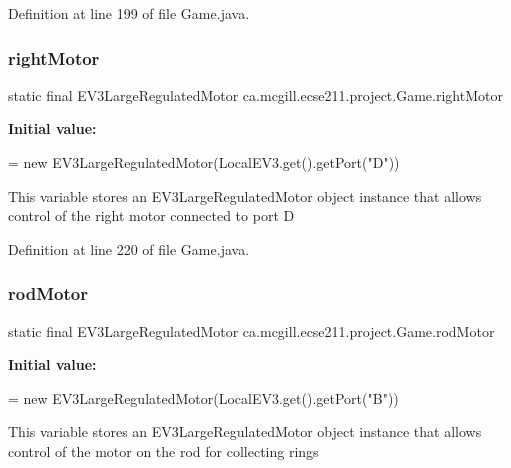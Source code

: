 Definition at line 199 of file Game.\+java.

\mbox{\label{enumca_1_1mcgill_1_1ecse211_1_1project_1_1_game_a7a05fcf37c4435c32270776a427ba0d2}} 
\subsubsection{\texorpdfstring{right\+Motor}{rightMotor}}
{\footnotesize\ttfamily  static  final E\+V3\+Large\+Regulated\+Motor ca.\+mcgill.\+ecse211.\+project.\+Game.\+right\+Motor\hspace{0.3cm}{\ttfamily [static]}}

{\bfseries Initial value\+:}
\begin{DoxyCode}
=
      \textcolor{keyword}{new} EV3LargeRegulatedMotor(LocalEV3.get().getPort(\textcolor{stringliteral}{"D"}))
\end{DoxyCode}
This variable stores an E\+V3\+Large\+Regulated\+Motor object instance that allows control of the right motor connected to port D 

Definition at line 220 of file Game.\+java.

\mbox{\label{enumca_1_1mcgill_1_1ecse211_1_1project_1_1_game_abc070af2fa5a5cda6d81977b35aacfb4}} 
\subsubsection{\texorpdfstring{rod\+Motor}{rodMotor}}
{\footnotesize\ttfamily  static  final E\+V3\+Large\+Regulated\+Motor ca.\+mcgill.\+ecse211.\+project.\+Game.\+rod\+Motor\hspace{0.3cm}{\ttfamily [static]}}

{\bfseries Initial value\+:}
\begin{DoxyCode}
=
      \textcolor{keyword}{new} EV3LargeRegulatedMotor(LocalEV3.get().getPort(\textcolor{stringliteral}{"B"}))
\end{DoxyCode}
This variable stores an E\+V3\+Large\+Regulated\+Motor object instance that allows control of the motor on the rod for collecting rings 

